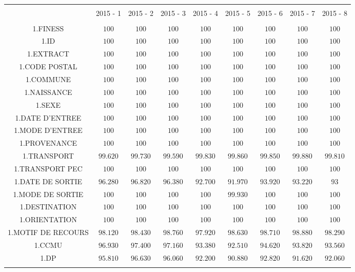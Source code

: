 \documentclass[]{article}
\begin{document}
\begin{table}[!htbp] \centering 
  \caption{} 
  \label{} 
\begin{tabular}{@{\extracolsep{5pt}} ccccccccc} 
\\[-1.8ex]\hline 
\hline \\[-1.8ex] 
 & 2015 - 1 & 2015 - 2 & 2015 - 3 & 2015 - 4 & 2015 - 5 & 2015 - 6 & 2015 - 7 & 2015 - 8 \\ 
\hline \\[-1.8ex] 
1.FINESS & $100$ & $100$ & $100$ & $100$ & $100$ & $100$ & $100$ & $100$ \\ 
1.ID & $100$ & $100$ & $100$ & $100$ & $100$ & $100$ & $100$ & $100$ \\ 
1.EXTRACT & $100$ & $100$ & $100$ & $100$ & $100$ & $100$ & $100$ & $100$ \\ 
1.CODE POSTAL & $100$ & $100$ & $100$ & $100$ & $100$ & $100$ & $100$ & $100$ \\ 
1.COMMUNE & $100$ & $100$ & $100$ & $100$ & $100$ & $100$ & $100$ & $100$ \\ 
1.NAISSANCE & $100$ & $100$ & $100$ & $100$ & $100$ & $100$ & $100$ & $100$ \\ 
1.SEXE & $100$ & $100$ & $100$ & $100$ & $100$ & $100$ & $100$ & $100$ \\ 
1.DATE D'ENTREE & $100$ & $100$ & $100$ & $100$ & $100$ & $100$ & $100$ & $100$ \\ 
1.MODE D'ENTREE & $100$ & $100$ & $100$ & $100$ & $100$ & $100$ & $100$ & $100$ \\ 
1.PROVENANCE & $100$ & $100$ & $100$ & $100$ & $100$ & $100$ & $100$ & $100$ \\ 
1.TRANSPORT & $99.620$ & $99.730$ & $99.590$ & $99.830$ & $99.860$ & $99.850$ & $99.880$ & $99.810$ \\ 
1.TRANSPORT PEC & $100$ & $100$ & $100$ & $100$ & $100$ & $100$ & $100$ & $100$ \\ 
1.DATE DE SORTIE & $96.280$ & $96.820$ & $96.380$ & $92.700$ & $91.970$ & $93.920$ & $93.220$ & $93$ \\ 
1.MODE DE SORTIE & $100$ & $100$ & $100$ & $100$ & $99.930$ & $100$ & $100$ & $100$ \\ 
1.DESTINATION & $100$ & $100$ & $100$ & $100$ & $100$ & $100$ & $100$ & $100$ \\ 
1.ORIENTATION & $100$ & $100$ & $100$ & $100$ & $100$ & $100$ & $100$ & $100$ \\ 
1.MOTIF DE RECOURS & $98.120$ & $98.430$ & $98.760$ & $97.920$ & $98.630$ & $98.710$ & $98.880$ & $98.290$ \\ 
1.CCMU & $96.930$ & $97.400$ & $97.160$ & $93.380$ & $92.510$ & $94.620$ & $93.820$ & $93.560$ \\ 
1.DP & $95.810$ & $96.630$ & $96.060$ & $92.200$ & $90.880$ & $92.820$ & $91.620$ & $92.060$ \\ 
\hline \\[-1.8ex] 
\end{tabular} 
\end{table}
\end{document}
